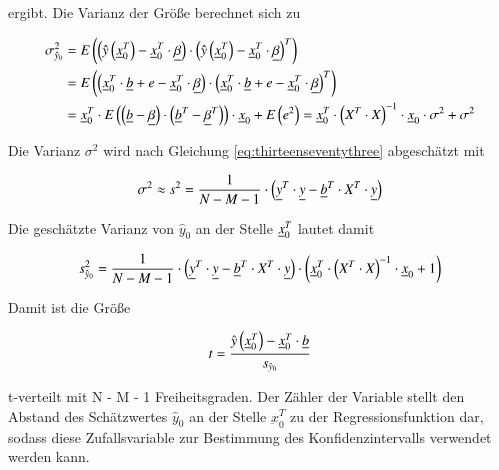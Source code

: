\noindent ergibt. Die Varianz der Gr\"{o}{\ss}e berechnet sich zu

\begin{equation}\label{eq:thirteenseventytwo}
\begin{split}
\sigma _{\hat{y}_{0} }^{2} & = E\left(\left(\hat{y}\left(\underline{x}_{0}^{T} \right)-\underline{x}_{0}^{T} \cdot \underline{\beta }\right)\cdot \left(\hat{y}\left(\underline{x}_{0}^{T} \right)-\underline{x}_{0}^{T} \cdot \underline{\beta }\right)^{T} \right)\\ 
& = E\left(\left(\underline{x}_{0}^{T} \cdot \underline{b}+e-\underline{x}_{0}^{T} \cdot \underline{\beta }\right)\cdot \left(\underline{x}_{0}^{T} \cdot \underline{b}+e-\underline{x}_{0}^{T} \cdot \underline{\beta }\right)^{T} \right)\\ 
& = \underline{x}_{0}^{T} \cdot E\left(\left(\underline{b}-\underline{\beta }\right)\cdot \left(\underline{b}^{T} -\underline{\beta }^{T} \right)\right)\cdot \underline{x}_{0} +E\left(e^{2} \right)=\underline{x}_{0}^{T} \cdot \left(X^{T} \cdot X\right)^{-1} \cdot \underline{x}_{0} \cdot \sigma ^{2} +\sigma ^{2} 
\end{split}
\end{equation}

\noindent Die Varianz $\sigma^{2}$ wird nach Gleichung \eqref{eq:thirteenseventythree} abgesch\"{a}tzt mit

\begin{equation}\label{eq:thirteenseventythree}
\sigma ^{2} \approx s^{2} =\frac{1}{N-M-1} \cdot \left(\underline{y}^{T} \cdot \underline{y}-\underline{b}^{T} \cdot X^{T} \cdot \underline{y}\right)
\end{equation}

\noindent Die gesch\"{a}tzte Varianz von $\hat{y}_0$ an der Stelle $\underline{x}_{0}^{T}$ lautet damit

\begin{equation}\label{eq:thirteenseventyfour}
s_{\hat{y}_{0} }^{2} =\frac{1}{N-M-1} \cdot \left(\underline{y}^{T} \cdot \underline{y}-\underline{b}^{T} \cdot X^{T} \cdot \underline{y}\right)\cdot \left(\underline{x}_{0}^{T} \cdot \left(X^{T} \cdot X\right)^{-1} \cdot \underline{x}_{0} +1\right)
\end{equation}

\noindent Damit ist die Gr\"{o}{\ss}e 

\begin{equation}\label{eq:thirteenseventyfive}
t=\frac{\hat{y}\left(\underline{x}_{0}^{T} \right)-\underline{x}_{0}^{T} \cdot \underline{b}}{s_{\hat{y}_{0}}}
\end{equation}

\noindent t-verteilt mit N - M - 1 Freiheitsgraden. Der Z\"{a}hler der Variable stellt den Abstand des Sch\"{a}tzwertes $\hat{y}_0$ an der Stelle $\underbar{x}_{0}^{T}$ zu der Regressionsfunktion dar, sodass diese Zufallsvariable zur Bestimmung des Konfidenzintervalls verwendet werden kann. 


